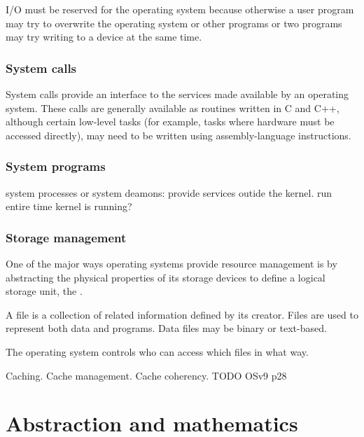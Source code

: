 I/O must be reserved for the operating system because otherwise a user program may try to overwrite the operating system or other programs or two programs may try writing to a device at the same time.

\subsection{System calls}
System calls provide an interface to the services made available by an operating system. These calls are generally available as routines written in C and C++, although certain low-level tasks (for example, tasks where hardware must be accessed directly), may need to be written using assembly-language instructions.

\subsection{System programs}
system processes or system deamons: provide services outide the kernel. run entire time kernel is running?

\subsection{Storage management}
One of the major ways operating systems provide resource management is by abstracting the physical properties of its storage devices to define a logical storage unit, the .

A file is a collection of related information defined by its creator. Files are used to represent both data and programs. Data files may be binary or text-based.

The operating system controls who can access which files in what way.

Caching. Cache management. Cache coherency. TODO OSv9 p28

\chapter{Abstraction and mathematics}